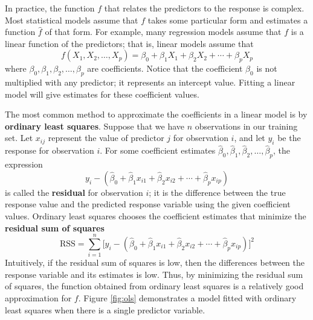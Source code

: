 \documentclass{article}
\begin{document}
	In practice, the function $f$ that relates the predictors to the response is complex. Most statistical models assume that $f$ takes some particular form and estimates a function $\hat{f}$ of that form. For example, many regression models assume that $f$ is a linear function of the predictors; that is, linear models assume that
	\begin{equation}\label{eqn:linear-model}
		f(X_1, X_2, \dotsc, X_p) = \beta_0 + \beta_1 X_1 + \beta_2 X_2 + \cdots + \beta_p X_p
	\end{equation}
	where $\beta_0, \beta_1, \beta_2, \dotsc, \beta_p$ are coefficients. Notice that the coefficient $\beta_0$ is not multiplied with any predictor; it represents an intercept value. Fitting a linear model will give estimates for these coefficient values.
	
	The most common method to approximate the coefficients in a linear model is by \textbf{ordinary least squares}. Suppose that we have $n$ observations in our training set. Let $x_{ij}$ represent the value of predictor $j$ for observation $i$, and let $y_i$ be the response for observation $i$. For some coefficient estimates $\hat{\beta}_0, \hat{\beta}_1, \hat{\beta}_2, \dotsc, \hat{\beta}_p$, the expression
	\begin{equation}
		y_i - (\hat{\beta}_0 + \hat{\beta}_1 x_{i1} + \hat{\beta}_2 x_{i2} + \cdots + \hat{\beta}_p x_{ip})
	\end{equation}
	is called the \textbf{residual} for observation $i$; it is the difference between the true response value and the predicted response variable using the given coefficient values. Ordinary least squares chooses the coefficient estimates that minimize the \textbf{residual sum of squares}
	\begin{equation}\label{eqn:RSS}
		\text{RSS} = \sum\limits_{i = 1}^n \Big[y_i - (\hat{\beta}_0 + \hat{\beta}_1 x_{i1} + \hat{\beta}_2 x_{i2} + \cdots + \hat{\beta}_p x_{ip})\Big]^2
	\end{equation}
	Intuitively, if the residual sum of squares is low, then the differences between the response variable and its estimates is low. Thus, by minimizing the residual sum of squares, the function obtained from ordinary least squares is a relatively good approximation for $f$. Figure \ref{fig:ols} demonstrates a model fitted with ordinary least squares when there is a single predictor variable.
	
\end{document}
